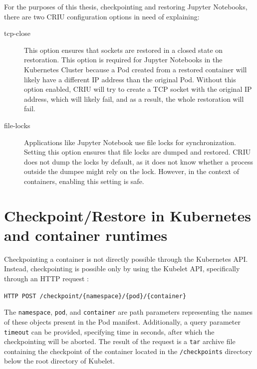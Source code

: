 \documentclass[
  digital,     %
  oneside,     %
  nosansbold,  %
  nocolorbold, %
  lof,         %
  nolot,         %
]{fithesis4}
\begin{document}
For the purposes of this thesis, checkpointing and restoring Jupyter Notebooks, there are two CRIU configuration options in need of explaining:

\begin{description}

    \item[tcp-close] This option ensures that sockets are restored in a closed state on restoration. This option is required for Jupyter Notebooks in the Kubernetes Cluster because a Pod created from a restored container will likely have a different IP address than the original Pod. Without this option enabled, CRIU will try to create a TCP socket with the original IP address, which will likely fail, and as a result, the whole restoration will fail.
    
    \item[file-locks] Applications like Jupyter Notebook use file locks for synchronization. Setting this option ensures that file locks are dumped and restored. CRIU does not dump the locks by default, as it does not know whether a process outside the dumpee might rely on the lock. However, in the context of containers, enabling this setting is safe.

\end{description}


\section{Checkpoint/Restore in Kubernetes and container runtimes}
\label{sec:criu:kubernetes}

Checkpointing a container is not directly possible through the Kubernetes API. Instead, checkpointing is possible only by using the Kubelet API, specifically through an HTTP request \cite{k8s_kubelet_api}:

\begin{description}
    \item[\texttt{HTTP POST /checkpoint/\{namespace\}/\{pod\}/\{container\}}]
\end{description}

The \texttt{namespace}, \texttt{pod}, and \texttt{container} are path parameters representing the names of these objects present in the Pod manifest. Additionally, a query parameter \texttt{timeout} can be provided, specifying time in seconds, after which the checkpointing will be aborted. The result of the request is a \texttt{tar} archive file containing the checkpoint of the container located in the \texttt{/checkpoints} directory below the root directory of Kubelet.
\end{document}
